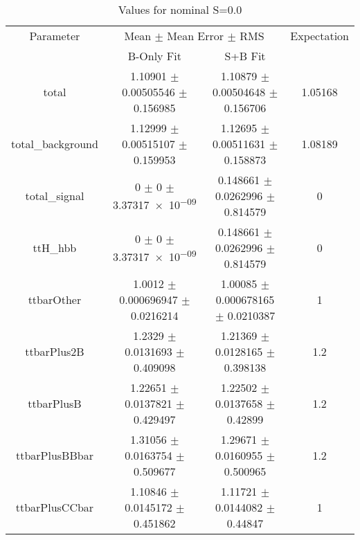 \begin{table}
\centering
\caption{Values for nominal S=0.0}
\begin{tabular}{cccc}
\toprule
Parameter & \multicolumn{2}{c}{Mean $\pm$ Mean Error $\pm$ RMS} & Expectation\\
 & B-Only Fit & S+B Fit & \\
\midrule
total & \num{1.10901} $\pm$ \num{0.00505546} $\pm$ \num{0.156985} & \num{1.10879} $\pm$ \num{0.00504648} $\pm$ \num{0.156706} & \num{1.05168}\\
total\_background & \num{1.12999} $\pm$ \num{0.00515107} $\pm$ \num{0.159953} & \num{1.12695} $\pm$ \num{0.00511631} $\pm$ \num{0.158873} & \num{1.08189}\\
total\_signal & \num{0} $\pm$ \num{0} $\pm$ \num{3.37317e-09} & \num{0.148661} $\pm$ \num{0.0262996} $\pm$ \num{0.814579} & \num{0}\\
ttH\_hbb & \num{0} $\pm$ \num{0} $\pm$ \num{3.37317e-09} & \num{0.148661} $\pm$ \num{0.0262996} $\pm$ \num{0.814579} & \num{0}\\
ttbarOther & \num{1.0012} $\pm$ \num{0.000696947} $\pm$ \num{0.0216214} & \num{1.00085} $\pm$ \num{0.000678165} $\pm$ \num{0.0210387} & \num{1}\\
ttbarPlus2B & \num{1.2329} $\pm$ \num{0.0131693} $\pm$ \num{0.409098} & \num{1.21369} $\pm$ \num{0.0128165} $\pm$ \num{0.398138} & \num{1.2}\\
ttbarPlusB & \num{1.22651} $\pm$ \num{0.0137821} $\pm$ \num{0.429497} & \num{1.22502} $\pm$ \num{0.0137658} $\pm$ \num{0.42899} & \num{1.2}\\
ttbarPlusBBbar & \num{1.31056} $\pm$ \num{0.0163754} $\pm$ \num{0.509677} & \num{1.29671} $\pm$ \num{0.0160955} $\pm$ \num{0.500965} & \num{1.2}\\
ttbarPlusCCbar & \num{1.10846} $\pm$ \num{0.0145172} $\pm$ \num{0.451862} & \num{1.11721} $\pm$ \num{0.0144082} $\pm$ \num{0.44847} & \num{1}\\
\bottomrule
\end{tabular}
\end{table}